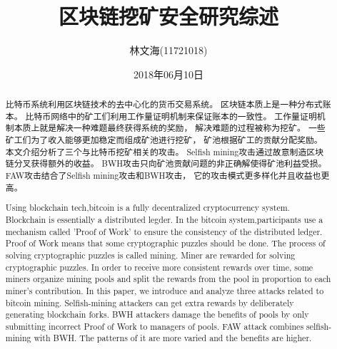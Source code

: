 \documentclass[a4paper, 11pt]{article}
\title{区块链挖矿安全研究综述}
\author{林文海(11721018)}
\date{2018年06月10日}
\begin{document}
    \setlength\parindent{2em}

        \renewcommand{\contentsname}{目录}  %
        \renewcommand{\abstractname}{摘要}  %
        \renewcommand{\refname}{参考资料}   %
        \renewcommand{\indexname}{索引}
        \renewcommand{\figurename}{图}
        \renewcommand{\tablename}{表}
        \renewcommand{\appendixname}{附录}
    
    \begin{CJK*}{UTF8}{gbsn}

    \maketitle
    
    \begin{abstract}
        比特币系统利用区块链技术的去中心化的货币交易系统。
        区块链本质上是一种分布式账本。
        比特币网络中的矿工们利用工作量证明机制来保证账本的一致性。
        工作量证明机制本质上就是解决一种难题最终获得系统的奖励，
        解决难题的过程被称为挖矿。
        一些矿工们为了收入能够更加稳定而组成矿池进行挖矿，
        矿池根据矿工的贡献分配奖励。
        本文介绍分析了三个与比特币挖矿相关的攻击。
        Selfish mining攻击通过故意制造区块链分叉获得额外的收益。
        BWH攻击只向矿池贡献问题的非正确解使得矿池利益受损。
        FAW攻击结合了Selfish mining攻击和BWH攻击，
        它的攻击模式更多样化并且收益也更高。


    \end{abstract}

    \renewcommand{\abstractname}{Abstract}

    \begin{abstract}
        Using blockchain tech,bitcoin is a fully decentralized cryptocurrency system.
        Blockchain is essentially a distributed legder.
        In the bitcoin system,participants use a mechanism called 'Proof of Work' to ensure the consistency of the distributed ledger.
        Proof of Work means that some cryptographic puzzles should be done.
        The process of solving cryptographic puzzles is called mining.
        Miner are rewarded for solving cryptographic puzzles.
        In order to receive more consistent rewards over time, 
        some miners organize mining pools and split the rewards from the pool in proportion to each miner’s contribution.
        In this paper,
        we introduce and analyze three attacks related to bitcoin mining.
        Selfish-mining attackers can get extra rewards by deliberately generating blockchain forks.
        BWH attackers damage the benefits of pools by only submitting incorrect Proof of Work to managers of pools.
        FAW attack combines selfish-mining with BWH.
        The patterns of it are more varied and the benefits are higher.



\end{abstract}
\end{CJK*}
\end{document}
